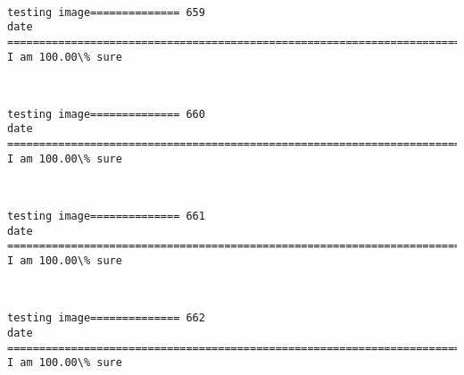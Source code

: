 \documentclass[11pt]{article}
\begin{document}
    \begin{center}
    \end{center}
    { \hspace*{\fill} \\}
    
    \begin{Verbatim}[commandchars=\\\{\}]
testing image============== 659
date
============================================================================
I am 100.00\% sure

    \end{Verbatim}

    \begin{center}
    \end{center}
    { \hspace*{\fill} \\}
    
    \begin{Verbatim}[commandchars=\\\{\}]
testing image============== 660
date
============================================================================
I am 100.00\% sure

    \end{Verbatim}

    \begin{center}
    \end{center}
    { \hspace*{\fill} \\}
    
    \begin{Verbatim}[commandchars=\\\{\}]
testing image============== 661
date
============================================================================
I am 100.00\% sure

    \end{Verbatim}

    \begin{center}
    \end{center}
    { \hspace*{\fill} \\}
    
    \begin{Verbatim}[commandchars=\\\{\}]
testing image============== 662
date
============================================================================
I am 100.00\% sure

    \end{Verbatim}
\end{document}
